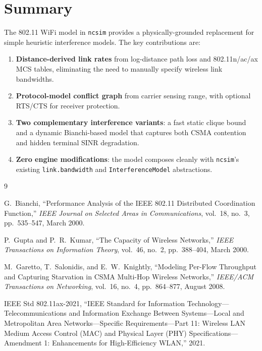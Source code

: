 \documentclass[11pt,letterpaper]{article}
\newcommand{\ncsim}{\texttt{ncsim}}
\begin{document}
\section{Summary}
\label{sec:summary}

The 802.11 WiFi model in \ncsim{} provides a physically-grounded replacement
for simple heuristic interference models.  The key contributions are:

\begin{enumerate}
\item \textbf{Distance-derived link rates} from log-distance path loss and
  802.11n/ac/ax MCS tables, eliminating the need to manually specify wireless
  link bandwidths.
\item \textbf{Protocol-model conflict graph} from carrier sensing range, with
  optional RTS/CTS for receiver protection.
\item \textbf{Two complementary interference variants}: a fast static clique
  bound and a dynamic Bianchi-based model that captures both CSMA contention
  and hidden terminal SINR degradation.
\item \textbf{Zero engine modifications}: the model composes cleanly with
  \ncsim{}'s existing \texttt{link.bandwidth} and \texttt{InterferenceModel}
  abstractions.
\end{enumerate}

\begin{thebibliography}{9}

G.~Bianchi,
``Performance Analysis of the IEEE 802.11 Distributed Coordination Function,''
\emph{IEEE Journal on Selected Areas in Communications},
vol.~18, no.~3, pp.~535--547, March 2000.

P.~Gupta and P.~R.~Kumar,
``The Capacity of Wireless Networks,''
\emph{IEEE Transactions on Information Theory},
vol.~46, no.~2, pp.~388--404, March 2000.

M.~Garetto, T.~Salonidis, and E.~W.~Knightly,
``Modeling Per-Flow Throughput and Capturing Starvation in CSMA Multi-Hop
Wireless Networks,''
\emph{IEEE/ACM Transactions on Networking},
vol.~16, no.~4, pp.~864--877, August 2008.

IEEE Std 802.11ax-2021,
``IEEE Standard for Information Technology---Telecommunications and
Information Exchange Between Systems---Local and Metropolitan Area
Networks---Specific Requirements---Part 11: Wireless LAN Medium Access Control
(MAC) and Physical Layer (PHY) Specifications---Amendment 1: Enhancements for
High-Efficiency WLAN,'' 2021.

\end{thebibliography}
\end{document}
